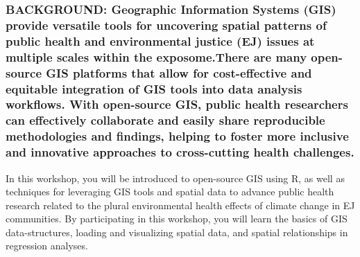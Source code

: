 \documentclass[
  12pt,
]{article}
\begin{document}
\hypertarget{background-geographic-information-systems-gis-provide-versatile-tools-for-uncovering-spatial-patterns-of-public-health-and-environmental-justice-ej-issues-at-multiple-scales-within-the-exposome.there-are-many-open-source-gis-platforms-that-allow-for-cost-effective-and-equitable-integration-of-gis-tools-into-data-analysis-workflows.-with-open-source-gis-public-health-researchers-can-effectively-collaborate-and-easily-share-reproducible-methodologies-and-findings-helping-to-foster-more-inclusive-and-innovative-approaches-to-cross-cutting-health-challenges.}{%
\subsubsection{BACKGROUND: Geographic Information Systems (GIS) provide
versatile tools for uncovering spatial patterns of public health and
environmental justice (EJ) issues at multiple scales within the
exposome.There are many open-source GIS platforms that allow for
cost-effective and equitable integration of GIS tools into data analysis
workflows. With open-source GIS, public health researchers can
effectively collaborate and easily share reproducible methodologies and
findings, helping to foster more inclusive and innovative approaches to
cross-cutting health
challenges.}\label{background-geographic-information-systems-gis-provide-versatile-tools-for-uncovering-spatial-patterns-of-public-health-and-environmental-justice-ej-issues-at-multiple-scales-within-the-exposome.there-are-many-open-source-gis-platforms-that-allow-for-cost-effective-and-equitable-integration-of-gis-tools-into-data-analysis-workflows.-with-open-source-gis-public-health-researchers-can-effectively-collaborate-and-easily-share-reproducible-methodologies-and-findings-helping-to-foster-more-inclusive-and-innovative-approaches-to-cross-cutting-health-challenges.}}

In this workshop, you will be introduced to open-source GIS using R, as
well as techniques for leveraging GIS tools and spatial data to advance
public health research related to the plural environmental health
effects of climate change in EJ communities. By participating in this
workshop, you will learn the basics of GIS data-structures, loading and
visualizing spatial data, and spatial relationships in regression
analyses.
\end{document}
